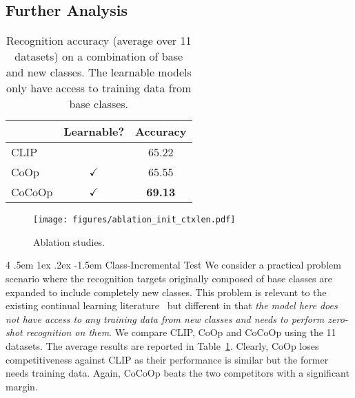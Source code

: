 \documentclass[10pt,twocolumn,letterpaper]{article}
\makeatletter
\renewcommand\paragraph{
  \@startsection{paragraph} {4} {\z@} {.5em \@plus1ex \@minus.2ex} {-1.5em} {\normalfont\normalsize\bfseries} }
\newcommand{\tableCellHeight}{1}
\newcommand{\tabstyle}[1]{
  \setlength{\tabcolsep}{#1}
  \renewcommand{\arraystretch}{\tableCellHeight}
  \centering
  \small
}
\makeatother
\begin{document}
\subsection{Further Analysis}
\label{sec:experiments;subsec:further_analysis}

\begin{table}[t]
    \tabstyle{8pt}
    \caption{Recognition accuracy (average over 11 datasets) on a combination of base and new classes. The learnable models only have access to training data from base classes.
    }
    \label{tab:cls_incre_test}
    \begin{tabular}{l cc}
    \toprule
    & Learnable? & Accuracy \\
    \midrule
    CLIP~\cite{radford2021learning} & & 65.22 \\
    CoOp~\cite{zhou2021coop} & $\checkmark$ & 65.55 \\
    CoCoOp & $\checkmark$ & \textbf{69.13} \\
    \bottomrule
    \end{tabular}
\end{table}

\begin{figure}[t]
    \centering
    \texttt{[image: figures/ablation\_init\_ctxlen.pdf]}
    \caption{Ablation studies.}
    \label{fig:ablation_init_ctxlen}
\end{figure}

\paragraph{Class-Incremental Test}
We consider a practical problem scenario where the recognition targets originally composed of base classes are expanded to include completely new classes. This problem is relevant to the existing continual learning literature~\cite{parisi2019continual} but different in that \emph{the model here does not have access to any training data from new classes and needs to perform zero-shot recognition on them}. We compare CLIP, CoOp and CoCoOp using the 11 datasets. The average results are reported in Table~\ref{tab:cls_incre_test}. Clearly, CoOp loses competitiveness against CLIP as their performance is similar but the former needs training data. Again, CoCoOp beats the two competitors with a significant margin.
\end{document}
